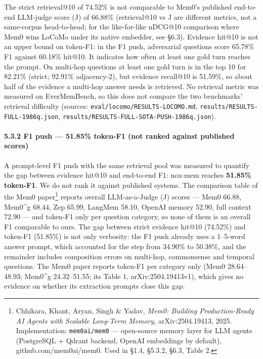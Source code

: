 \documentclass[
]{article}
\newcounter{none} %
\begin{document}
The strict retrieval@10 of 74.52\% is not comparable to Mem0's published
end-to-end LLM-judge score (J) of 66.88\% (retrieval@10 vs J are
different metrics, not a same-corpus head-to-head; for the like-for-like
nDCG@10 comparison where Mem0 wins LoCoMo under its native embedder, see
§6.3). Evidence hit@10 is not an upper bound on token-F1: in the F1
push, adversarial questions score 65.78\% F1 against 60.18\% hit@10. It
indicates how often at least one gold turn reaches the prompt. On
multi-hop questions at least one gold turn is in the top 10 for 82.21\%
(strict; 92.91\% adjacency-2), but evidence recall@10 is 51.59\%, so
about half of the evidence a multi-hop answer needs is retrieved. No
retrieval metric was measured on EverMemBench, so this does not compare
the two benchmarks' retrieval difficulty (sources:
\texttt{eval/locomo/RESULTS-LOCOMO.md},
\texttt{results/RESULTS-FULL-1986q.json},
\texttt{results/RESULTS-FULL-SOTA-PUSH-1986q.json}).

\paragraph{5.3.2 F1 push --- 51.85\% token-F1 (not ranked against
published
scores)}\label{f1-push-51.85-token-f1-not-ranked-against-published-scores}

A prompt-level F1 push with the same retrieval pool was measured to
quantify the gap between evidence hit@10 and end-to-end F1: nox-mem
reaches \textbf{51.85\% token-F1}. We do not rank it against published
systems. The comparison table of the Mem0 paper\footnote{Chhikara,
  Khant, Aryan, Singh \& Yadav, \emph{Mem0: Building Production-Ready AI
  Agents with Scalable Long-Term Memory}, arXiv:2504.19413, 2025.
  Implementation: \texttt{mem0ai/mem0} --- open-source memory layer for
  LLM agents (PostgreSQL + Qdrant backend, OpenAI embeddings by
  default), github.com/mem0ai/mem0. Used in §1.4, §5.3.2, §6.3, Table 2.}
reports overall LLM-as-a-Judge (J) scores --- Mem0 66.88, Mem0\^{}g
68.44, Zep 65.99, LangMem 58.10, OpenAI memory 52.90, full context 72.90
--- and token-F1 only per question category, so none of them is an
overall F1 comparable to ours. The gap between strict evidence hit@10
(74.52\%) and token-F1 (51.85\%) is not only verbosity: the F1 push
already uses a 1--5-word answer prompt, which accounted for the step
from 34.90\% to 50.38\%, and the remainder includes composition errors
on multi-hop, commonsense and temporal questions. The Mem0 paper reports
token-F1 per category only (Mem0 28.64--48.93; Mem0\^{}g 24.32--51.55;
its Table 1, arXiv:2504.19413v1), which gives no evidence on whether its
extraction prompts close this gap.
\end{document}
